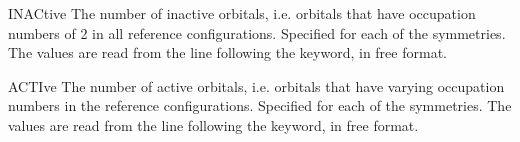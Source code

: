 \begin{keywordlist}
\item[INACtive]
The number of inactive orbitals, i.e. orbitals that have
occupation numbers of 2 in all reference configurations. Specified for
each of the symmetries. The values are read from the line
following the keyword, in free format.
\item[ACTIve]
The number of active orbitals, i.e. orbitals that have varying
occupation numbers in the reference configurations. Specified for each
of the symmetries. The values are read from the line following
the keyword, in free format.


\end{keywordlist}
